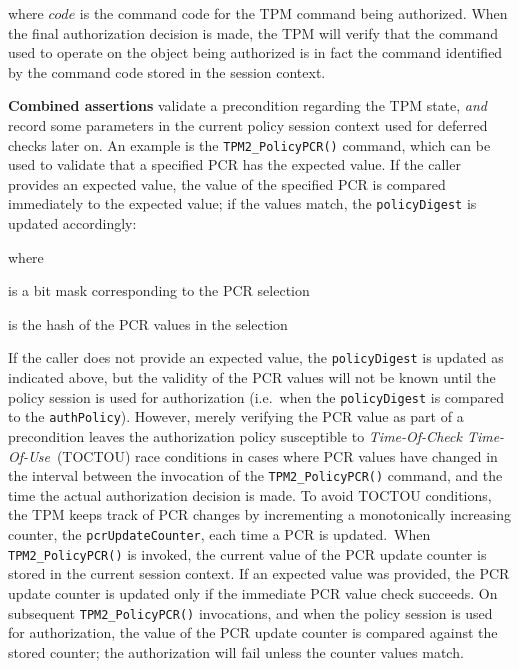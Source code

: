 \documentclass{sig-alternate-2013}
\begin{document}
\vspace{.5\baselineskip}

where $code$ is the command code for the TPM command being authorized. When the
final authorization decision is made, the TPM will verify that the command used
to operate on the object being authorized is in fact the command identified by
the command code stored in the session context.

\noindent\textbf{Combined assertions} validate a precondition regarding the
TPM state, \emph{and} record some parameters in the current policy session
context used for deferred checks later on. An example is the
\texttt{TPM2\_PolicyPCR()} command, which can be used to validate that a
specified PCR has the expected value. If the caller provides an expected value,
the value of the specified PCR is compared immediately to the expected value; if
the values match, the \texttt{policyDigest} is updated accordingly:

\vspace{.5\baselineskip}
\noindent
{}

\vspace{.5\baselineskip}
\noindent where

\begin{description}
  \small
  \item[$PCRs$]   \hfill is a bit mask corresponding to the PCR selection
  \item[$digest$] \hfill is the hash of the PCR values in the selection
\end{description}

If the caller does not provide an expected value, the \texttt{policyDigest} is
updated as indicated above, but the validity of the PCR values will not be known
until the policy session is used for authorization (i.e.\ when the
\texttt{policyDigest} is compared to the \texttt{authPolicy}).  However, merely
verifying the PCR value as part of a precondition leaves the authorization
policy susceptible to \emph{Time-Of-Check Time-Of-Use}\footnotemark\ (TOCTOU)
race conditions in cases where PCR values have changed in the interval between
the invocation of the \texttt{TPM2\_PolicyPCR()} command, and the time the actual
authorization decision is made. To avoid TOCTOU conditions, the TPM keeps track
of PCR changes by incrementing a monotonically increasing counter, the
\texttt{pcrUpdateCounter}, each time a PCR is updated.\ When
\texttt{TPM2\_PolicyPCR()} is invoked, the current value of the PCR update
counter is stored in the current session context. If an expected value was
provided, the PCR update counter is updated only if the immediate PCR value
check succeeds. On subsequent \texttt{TPM2\_PolicyPCR()} invocations, and when
the policy session is used for authorization, the value of the PCR update
counter is compared against the stored counter; the authorization will fail
unless the counter values match.
\end{document}
